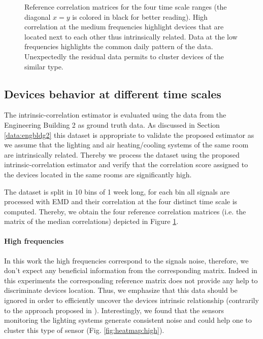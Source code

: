 \begin{figure}[t!]
\caption{Reference correlation matrices for the four time scale ranges (the diagonal $x=y$ is colored in black for better reading). High correlation at the medium frequencies highlight devices that are located next to each other thus intrinsically related. Data at the low frequencies highlights the common daily pattern of the data. Unexpectedly the residual data permits to cluster devices of the similar type.}
\label{fig:heatmap}
\end{figure}

\subsection{Devices behavior at different time scales}
The intrinsic-correlation estimator is evaluated using the data from the Engineering Building 2 as ground truth data.
As discussed in Section \ref{data:engbldg2} this dataset is appropriate to validate the proposed estimator as we assume that the lighting and air heating/cooling systems of the same room are intrinsically related.
Thereby we process the dataset using the proposed intrinsic-correlation estimator and verify that the correlation score assigned to the devices located in the same rooms are significantly high.

The dataset is split in 10 bins of 1 week long, for each bin all signals are processed with EMD and their correlation at the four distinct time scale is computed. 
Thereby, we obtain the four reference correlation matrices (i.e. the matrix of the median correlations) depicted in Figure \ref{fig:heatmap}.

\paragraph{High frequencies}
In this work the high frequencies correspond to the signals noise, therefore, we don't expect any beneficial information from the corresponding matrix.
Indeed in this experiments the corresponding reference matrix does not provide any help to discriminate devices location.
Thus, we emphasize that this data should be ignored in order to efficiently uncover the devices intrinsic relationship (contrarily to the approach proposed in \cite{romain:iotapp12}).
Interestingly, we found that the sensors monitoring the lighting systems generate consistent noise and could help one to cluster this type of sensor (Fig. \ref{fig:heatmap:high}).
  
